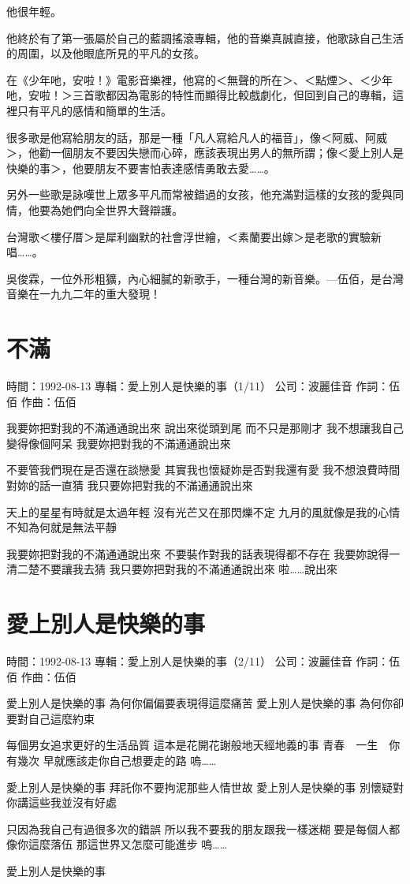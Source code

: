 \documentclass[UTF8,a4paper,oneside,twocolumn,12pt]{ctexbook}
\newcommand{\infopair}[2]{\textbullet #1：#2}
\newcommand{\zc}[1][伍佰]{\infopair{作詞}{#1}}
\newcommand{\zq}[1][伍佰]{\infopair{作曲}{#1}}
\newcommand{\zj}[1]{\infopair{專輯}{#1}}
\newcommand{\sj}[1]{\infopair{時間}{#1}}
\newcommand{\gs}[1]{\infopair{公司}{#1}}
\newenvironment{info}{\begin{flushleft}\kaishu
	}
	{\end{flushleft}\normalsize\yahei\par}
\newenvironment{lyric}{
	}
{}
\begin{document}
他很年輕。

他終於有了第一張屬於自己的藍調搖滾專輯，他的音樂真誠直接，他歌詠自己生活的周圍，以及他眼底所見的平凡的女孩。

在《少年吔，安啦！》電影音樂裡，他寫的＜無聲的所在＞、＜點煙＞、＜少年吔，安啦！＞三首歌都因為電影的特性而顯得比較戲劇化，但回到自己的專輯，這裡只有平凡的感情和簡單的生活。

很多歌是他寫給朋友的話，那是一種「凡人寫給凡人的福音」，像＜阿威、阿威＞，他勸一個朋友不要因失戀而心碎，應該表現出男人的無所謂；像＜愛上別人是快樂的事＞，他要朋友不要害怕表達感情勇敢去愛……。

另外一些歌是詠嘆世上眾多平凡而常被錯過的女孩，他充滿對這樣的女孩的愛與同情，他要為她們向全世界大聲辯護。

台灣歌＜樓仔厝＞是犀利幽默的社會浮世繪，＜素蘭要出嫁＞是老歌的實驗新唱……。

吳俊霖，一位外形粗獷，內心細膩的新歌手，一種台灣的新音樂。—伍佰，是台灣音樂在一九九二年的重大發現！

\section{不滿}
\begin{info}
	\sj{1992-08-13}
	\zj{愛上別人是快樂的事（1/11）}
	\gs{波麗佳音}
	\zc
	\zq
\end{info}
\begin{lyric}
	我要妳把對我的不滿通通說出來
	說出來從頭到尾 而不只是那剛才
	我不想讓我自己變得像個阿呆
	我要妳把對我的不滿通通說出來

	不要管我們現在是否還在談戀愛
	其實我也懷疑妳是否對我還有愛
	我不想浪費時間對妳的話一直猜
	我只要妳把對我的不滿通通說出來

	天上的星星有時就是太過年輕
	沒有光芒又在那閃爍不定
	九月的風就像是我的心情
	不知為何就是無法平靜

	我要妳把對我的不滿通通說出來
	不要裝作對我的話表現得都不存在
	我要妳說得一清二楚不要讓我去猜
	我只要妳把對我的不滿通通說出來
	啦……說出來
\end{lyric}

\section{愛上別人是快樂的事}
\begin{info}
	\sj{1992-08-13}
	\zj{愛上別人是快樂的事（2/11）}
	\gs{波麗佳音}
	\zc
	\zq
\end{info}
\begin{lyric}
	愛上別人是快樂的事
	為何你偏偏要表現得這麼痛苦
	愛上別人是快樂的事
	為何你卻要對自己這麼約束

	每個男女追求更好的生活品質
	這本是花開花謝般地天經地義的事
	青春　一生　你有幾次
	早就應該走你自己想要走的路
	嗚……

	愛上別人是快樂的事
	拜託你不要拘泥那些人情世故
	愛上別人是快樂的事
	別懷疑對你講這些我並沒有好處

	只因為我自己有過很多次的錯誤
	所以我不要我的朋友跟我一樣迷糊
	要是每個人都像你這麼落伍
	那這世界又怎麼可能進步
	嗚……

	愛上別人是快樂的事
\end{lyric}
\end{document}
